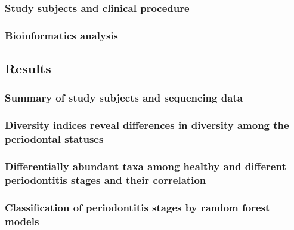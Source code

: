 \documentclass[11pt, a4paper, onecolumn, oneside]{report}
\begin{document}
            \subsubsection{Study subjects and clinical procedure}
            \subsubsection{Bioinformatics analysis}
        \newpage

        \subsection{Results}
            \subsubsection{Summary of study subjects and sequencing data}
            \subsubsection{Diversity indices reveal differences in diversity among the periodontal statuses}
            \subsubsection{Differentially abundant taxa among healthy and different periodontitis stages and their correlation}
            \subsubsection{Classification of periodontitis stages by random forest models}
\end{document}
